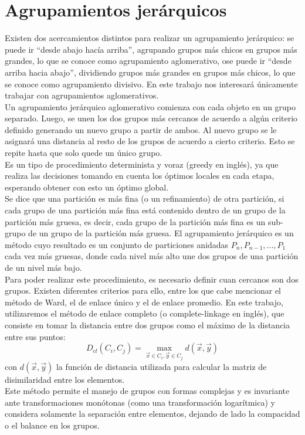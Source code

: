 \section{Agrupamientos jerárquicos}
Existen dos acercamientos distintos para realizar un agrupamiento jerárquico: se puede ir ``desde abajo hacía arriba'', agrupando grupos más chicos en grupos más grandes, lo que se conoce como agrupamiento aglomerativo, ose puede ir ``desde arriba hacia abajo'', dividiendo grupos más grandes en grupos más chicos, lo que se conoce como agrupamiento divisivo. En este trabajo nos interesará únicamente trabajar con agrupamientos aglomerativos.\\
Un agrupamiento jerárquico aglomerativo comienza con cada objeto en un grupo separado. Luego, se unen los dos grupos más cercanos de acuerdo a algún criterio definido generando un nuevo grupo a partir de ambos. Al nuevo grupo se le asignará una distancia al resto de los grupos de acuerdo a cierto criterio. Esto se repite hasta que solo quede un único grupo.\\
Es un tipo de procedimiento determinista y voraz (greedy en inglés), ya que realiza las decisiones tomando en cuenta los óptimos locales en cada etapa, esperando obtener con esto un óptimo global.\\
Se dice que una partición es más fina (o un refinamiento) de otra partición, si cada grupo de una partición más fina está contenido dentro de un grupo de la partición más gruesa, es decir, cada grupo de la partición más fina es un sub-grupo de un grupo de la partición más gruesa. El agrupamiento jerárquico es un método cuyo resultado es un conjunto de particiones anidadas $P_n, P_{n-1}, ..., P_1$ cada vez más gruesas, donde cada nivel más alto une dos grupos de una partición de un nivel más bajo.\\
Para poder realizar este procedimiento, es necesario definir cuan cercanos son dos grupos. Existen diferentes criterios para ello, entre los que cabe mencionar el método de Ward, el de enlace único y el de enlace promedio. En este trabajo, utilizaremos el método de enlace completo (o complete-linkage en inglés), que consiste en tomar la distancia entre dos grupos como el máximo de la distancia entre sus puntos:
\begin{equation}
	D_{cl}(C_i, C_j) = \max\limits_{\vec{x} \in C_i, \vec{y} \in C_j} d(\vec{x}, \vec{y})
\end{equation}
con $d(\vec{x}, \vec{y})$ la función de distancia utilizada para calcular la matriz de disimilaridad entre los elementos.\\
Este método permite el manejo de grupos con formas complejas y es invariante ante transformaciones monótonas (como una transformación logarítmica) \cite{Johnson1967} y considera solamente la separación entre elementos, dejando de lado la compacidad o el balance en los grupos.\cite{Shalizi2009, Gan2007}

